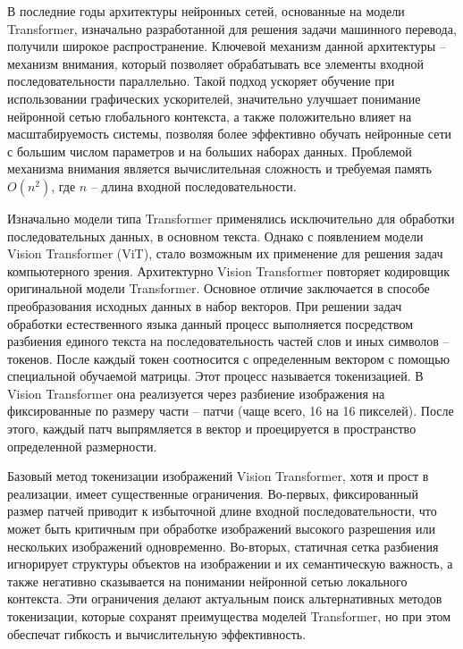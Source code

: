 \documentclass[times,specification,annotation]{itmo-student-thesis}
\begin{document}
\startprefacepage

В последние годы архитектуры нейронных сетей, основанные на модели Transformer, изначально разработанной для решения задачи машинного перевода, получили широкое распространение. Ключевой механизм данной архитектуры – механизм внимания, который позволяет обрабатывать все элементы входной последовательности параллельно. Такой подход ускоряет обучение при использовании графических ускорителей, значительно улучшает понимание нейронной сетью глобального контекста, а также положительно влияет на масштабируемость системы, позволяя более эффективно обучать нейронные сети с большим числом параметров и на больших наборах данных.  Проблемой механизма внимания является вычислительная сложность и требуемая память $O(n^2 )$, где $n$ – длина входной последовательности.

Изначально модели типа Transformer применялись исключительно для обработки последовательных данных, в основном текста. Однако с появлением модели Vision Transformer (ViT),  стало возможным их применение для решения задач компьютерного зрения.  Архитектурно Vision Transformer повторяет кодировщик оригинальной модели Transformer. Основное отличие заключается в способе преобразования исходных данных в набор векторов. При решении задач обработки естественного языка данный процесс выполняется посредством разбиения единого текста на последовательность частей слов и иных символов – токенов. После каждый токен соотносится с определенным вектором с помощью специальной обучаемой матрицы. Этот процесс называется токенизацией. В Vision Transformer она реализуется через разбиение изображения на фиксированные по размеру части – патчи (чаще всего, 16 на 16 пикселей). После этого, каждый патч выпрямляется в вектор и проецируется в пространство определенной размерности.

Базовый метод токенизации изображений Vision Transformer, хотя и прост в реализации, имеет существенные ограничения. Во-первых, фиксированный размер патчей приводит к избыточной длине входной последовательности, что может быть критичным при обработке изображений высокого разрешения или нескольких изображений одновременно. Во-вторых, статичная сетка разбиения игнорирует структуры объектов на изображении  и их семантическую важность, а также негативно сказывается на понимании нейронной сетью локального контекста. Эти ограничения делают актуальным поиск альтернативных методов токенизации, которые сохранят преимущества моделей Transformer, но при этом обеспечат гибкость и вычислительную эффективность.
\end{document}
